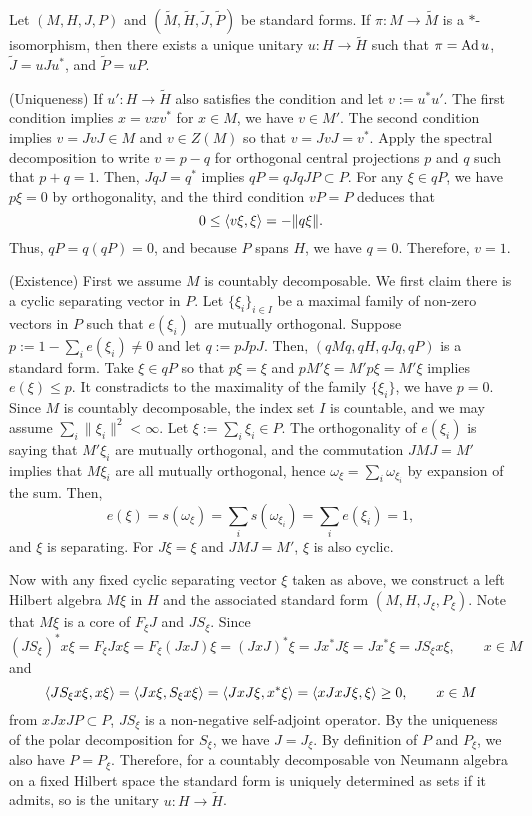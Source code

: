 \documentclass{../../../small}
\begin{document}
\begin{prop}[Uniqueness]
Let $(M,H,J,P)$ and $(\tilde M,\tilde H,\tilde J,\tilde P)$ be standard forms.
If $\pi:M\to\tilde M$ is a $*$-isomorphism, then there exists a unique unitary $u:H\to\tilde H$ such that $\pi=\operatorname{Ad} u$, $\tilde J=uJu^*$, and $\tilde P=uP$.
\end{prop}
\begin{pf}
(Uniqueness)
If $u':H\to \tilde H$ also satisfies the condition and let $v:=u^*u'$.
The first condition implies $x=vxv^*$ for $x\in M$, we have $v\in M'$.
The second condition implies $v=JvJ\in M$ and $v\in Z(M)$ so that $v=JvJ=v^*$.
Apply the spectral decomposition to write $v=p-q$ for orthogonal central projections $p$ and $q$ such that $p+q=1$.
Then, $JqJ=q^*$ implies $qP=qJqJP\subset P$.
For any $\xi\in qP$, we have $p\xi=0$ by orthogonality, and the third condition $vP=P$ deduces that
\[0\le\langle v\xi,\xi\rangle=-\|q\xi\|.\]
Thus, $qP=q(qP)=0$, and because $P$ spans $H$, we have $q=0$.
Therefore, $v=1$.

(Existence)
First we assume $M$ is countably decomposable.
We first claim there is a cyclic separating vector in $P$.
Let $\{\xi_i\}_{i\in I}$ be a maximal family of non-zero vectors in $P$ such that $e(\xi_i)$ are mutually orthogonal.
Suppose $p:=1-\sum_ie(\xi_i)\ne0$ and let $q:=pJpJ$.
Then, $(qMq,qH,qJq,qP)$ is a standard form.
Take $\xi\in qP$ so that $p\xi=\xi$ and $pM'\xi=M'p\xi=M'\xi$ implies $e(\xi)\le p$.
It constradicts to the maximality of the family $\{\xi_i\}$, we have $p=0$.
Since $M$ is countably decomposable, the index set $I$ is countable, and we may assume $\sum_i\|\xi_i\|^2<\infty$.
Let $\xi:=\sum_i\xi_i\in P$.
The orthogonality of $e(\xi_i)$ is saying that $M'\xi_i$ are mutually orthogonal, and the commutation $JMJ=M'$ implies that $M\xi_i$ are all mutually orthogonal, hence $\omega_\xi=\sum_i\omega_{\xi_i}$ by expansion of the sum.
Then,
\[e(\xi)=s(\omega_\xi)=\sum_is(\omega_{\xi_i})=\sum_ie(\xi_i)=1,\]
and $\xi$ is separating.
For $J\xi=\xi$ and $JMJ=M'$, $\xi$ is also cyclic.

Now with any fixed cyclic separating vector $\xi$ taken as above, we construct a left Hilbert algebra $M\xi$ in $H$ and the associated standard form $(M,H,J_\xi,P_\xi)$.
Note that $M\xi$ is a core of $F_\xi J$ and $JS_\xi$.
Since
\[(JS_\xi)^*x\xi=F_\xi Jx\xi=F_\xi(JxJ)\xi=(JxJ)^*\xi=Jx^*J\xi=Jx^*\xi=JS_\xi x\xi,\qquad x\in M\]
and
\[\langle JS_\xi x\xi,x\xi\rangle=\langle Jx\xi,S_\xi x\xi\rangle=\langle JxJ\xi,x^*\xi\rangle=\langle xJxJ\xi,\xi\rangle\ge0,\qquad x\in M\]
from $xJxJP\subset P$, $JS_\xi$ is a non-negative self-adjoint operator.
By the uniqueness of the polar decomposition for $S_\xi$, we have $J=J_\xi$.
By definition of $P$ and $P_\xi$, we also have $P=P_\xi$.
Therefore, for a countably decomposable von Neumann algebra on a fixed Hilbert space the standard form is uniquely determined as sets if it admits, so is the unitary $u:H\to\tilde H$.


\end{pf}
\end{document}
